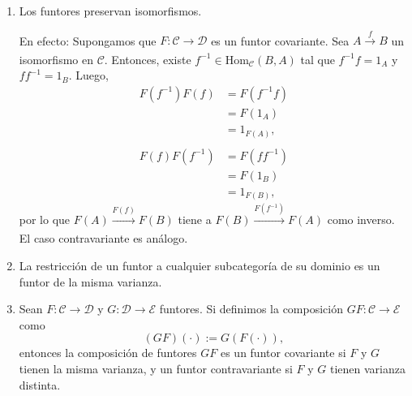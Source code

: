 \documentclass[tesis]{subfiles}
\begin{document}
\begin{Obs}\label{Obs: Funtores}\leavevmode

    \begin{enumerate}[label=(\arabic*)]

        \item Los funtores preservan isomorfismos.

            En efecto: Supongamos que $F:\mathscr{C}\to \mathscr{D}$ es un funtor covariante. Sea $A\xrightarrow[]{f}B$ un isomorfismo en $\mathscr{C}$. Entonces, existe $f^{-1}\in\text{Hom}_\mathscr{C}(B,A)$ tal que $f^{-1}f=1_A$ y $ff^{-1}=1_B$. Luego,
            \begin{align*}
                F(f^{-1})F(f) &= F(f^{-1}f) \\
                              &= F(1_A) \\
                              &= 1_{F(A)}, \\ \\
                F(f)F(f^{-1}) &= F(ff^{-1}) \\
                              &= F(1_B) \\
                              &= 1_{F(B)},
            \end{align*}
            por lo que $F(A)\xrightarrow[]{F(f)}F(B)$ tiene a $F(B)\xrightarrow[]{F(f^{-1})}F(A)$ como inverso. El caso contravariante es análogo.

        \item La restricción de un funtor a cualquier subcategoría de su dominio es un funtor de la misma varianza.

        \item Sean $F:\mathscr{C}\to \mathscr{D}$ y $G:\mathscr{D}\to \mathscr{E}$ funtores. Si definimos la composición $GF:\mathscr{C}\to \mathscr{E}$ como
            \[
                (GF)(\cdot) := G(F(\cdot)),
            \] 
            entonces la composición de funtores $GF$ es un funtor covariante si $F$ y $G$ tienen la misma varianza, y un funtor contravariante si $F$ y $G$ tienen varianza distinta.

   \end{enumerate}
\end{Obs}
\end{document}

